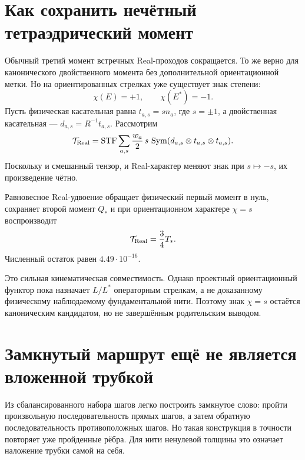 \section{Как сохранить нечётный тетраэдрический момент}

Обычный третий момент встречных Real-проходов сокращается. То же верно для
канонического двойственного момента без дополнительной ориентационной
метки. Но на ориентированных стрелках уже существует знак степени:
\begin{equation}
 \chi(E)=+1,
 \qquad
 \chi(E^*)=-1.
\end{equation}
Пусть физическая касательная равна $t_{a,s}=s n_a$, где $s=\pm1$, а
двойственная касательная --- $d_{a,s}=R^{-1}t_{a,s}$. Рассмотрим
\begin{equation}
 \mathcal T_{\rm Real}
 =\operatorname{STF}\sum_{a,s}\frac{w_a}{2}\,s\,
 \operatorname{Sym}(d_{a,s}\otimes t_{a,s}\otimes t_{a,s}).
\end{equation}
Поскольку и смешанный тензор, и Real-характер меняют знак при
$s\mapsto-s$, их произведение чётно.

\begin{theorem}
Равновесное Real-удвоение обращает физический первый момент в нуль,
сохраняет второй момент $Q_*$ и при ориентационном характере $\chi=s$
воспроизводит
\begin{equation}
 \mathcal T_{\rm Real}=\frac34T_*.
\end{equation}
Численный остаток равен $4.49\cdot10^{-16}$.
\end{theorem}

Это сильная кинематическая совместимость. Однако проектный
ориентационный функтор пока назначает $L/L^*$ операторным стрелкам, а не
доказанному физическому наблюдаемому фундаментальной нити. Поэтому знак
$\chi=s$ остаётся каноническим кандидатом, но не завершённым родительским
выводом.

\section{Замкнутый маршрут ещё не является вложенной трубкой}

Из сбалансированного набора шагов легко построить замкнутое слово: пройти
произвольную последовательность прямых шагов, а затем обратную
последовательность противоположных шагов. Но такая конструкция в точности
повторяет уже пройденные рёбра. Для нити ненулевой толщины это означает
наложение трубки самой на себя.

